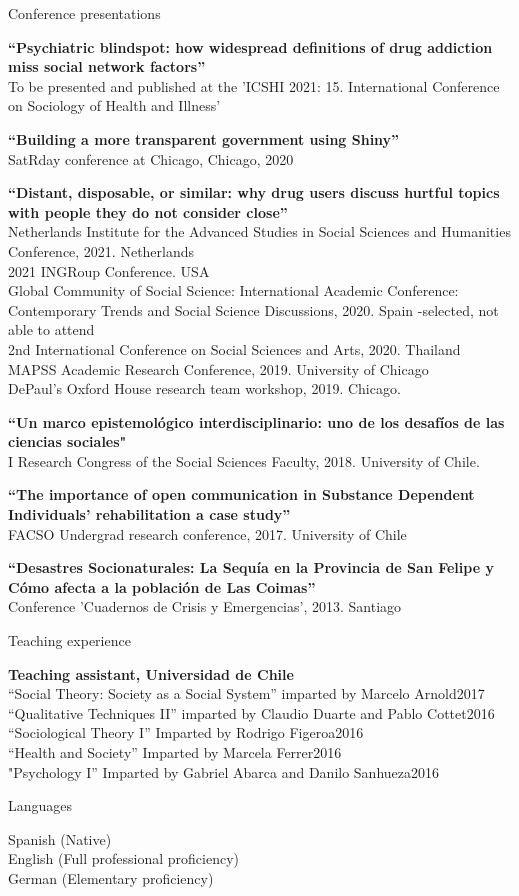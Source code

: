 \documentclass{resume} %
\begin{document}
\begin{rSection}{Conference presentations}

\textbf{“Psychiatric blindspot: how widespread definitions of drug addiction miss social network factors”}\\
To be presented and published at the 'ICSHI 2021: 15. International Conference on Sociology of Health and Illness'

\textbf{“Building a more transparent government using Shiny”}\\
SatRday conference at Chicago, Chicago, 2020

\textbf{“Distant, disposable, or similar:  why drug users discuss hurtful topics with people they do not consider close”}\\
Netherlands Institute for the Advanced Studies in Social Sciences and Humanities Conference, 2021. Netherlands\\
2021 INGRoup Conference. USA\\
Global Community of Social Science: International Academic Conference: Contemporary Trends and Social Science Discussions, 2020. Spain -selected, not able to attend\\
2nd International Conference on Social Sciences and Arts, 2020. Thailand\\
MAPSS Academic Research Conference, 2019. University of Chicago\\
DePaul’s Oxford House research team workshop, 2019. Chicago. 

\textbf{“Un marco epistemológico interdisciplinario: uno de los desafíos de las ciencias sociales"}\\
I Research Congress of the Social Sciences Faculty, 2018. University of Chile. 

\textbf{“The importance of open communication in Substance Dependent Individuals' rehabilitation a case study”}\\
FACSO Undergrad research conference, 2017. University of Chile

\textbf{“Desastres Socionaturales: La Sequía en la Provincia de San Felipe y Cómo afecta a la población de Las Coimas”}\\
Conference 'Cuadernos de Crisis y Emergencias', 2013. Santiago

\end{rSection} 

\begin{rSection}{Teaching experience}

\textbf{Teaching assistant, Universidad de Chile}\\
“Social Theory: Society as a Social System” imparted by Marcelo Arnold\hfill 2017\\
“Qualitative Techniques II” imparted by Claudio Duarte and Pablo Cottet\hfill2016\\
“Sociological Theory I” Imparted by Rodrigo Figeroa\hfill2016\\
“Health and Society” Imparted by Marcela Ferrer\hfill2016\\
"Psychology I” Imparted by Gabriel Abarca and Danilo Sanhueza\hfill2016

\end{rSection}

\begin{rSection}{Languages}

Spanish (Native)\\
English (Full professional proficiency)\\
German (Elementary proficiency)

\end{rSection}
\end{document}
